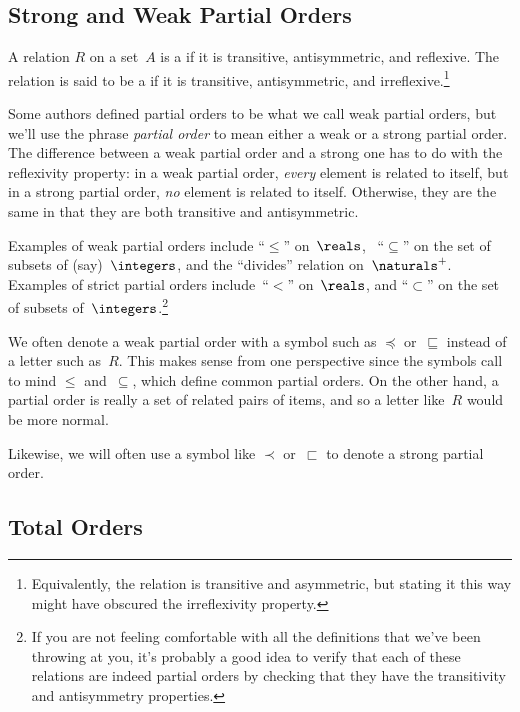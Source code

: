 \subsection{Strong and Weak Partial Orders}

\begin{definition}\label{def:weak_po}

A relation $R$ on a set~$A$ is a  if it is
transitive, antisymmetric, and reflexive.  The relation is said to be
a  if it is transitive, antisymmetric, and
irreflexive.\footnote{Equivalently, the relation is transitive and
  asymmetric, but stating it this way might have obscured the
  irreflexivity property.}

\end{definition}

Some authors defined partial orders to be what we call weak partial
orders, but we'll use the phrase \emph{partial order} to mean either a
weak or a strong partial order.  The difference between a weak partial
order and a strong one has to do with the reflexivity property: in a
weak partial order, \emph{every} element is related to itself, but in
a strong partial order, \emph{no} element is related to itself.
Otherwise, they are the same in that they are both transitive and
antisymmetric.

Examples of weak partial orders include ``$\le$'' on~$\reals$,
\ ``$\subseteq$'' on the set of subsets of (say)~$\integers$, and the
``divides'' relation on~$\naturals^+$.  Examples of strict partial
orders include~``$<$'' on~$\reals$, and ``$\subset$'' on the set of
subsets of~$\integers$.\footnote{If you are not feeling comfortable
  with all the definitions that we've been throwing at you, it's
  probably a good idea to verify that each of these relations are
  indeed partial orders by checking that they have the transitivity
  and antisymmetry properties.}

We often denote a weak partial order with a symbol such as $\preceq$
or~$\sqsubseteq$ instead of a letter such as~$R$.    This makes sense
from one perspective since the symbols call to mind $\le$
and~$\subseteq$, which define common partial orders.  On the other
hand, a partial order is really a set of related pairs of items, and
so a letter like~$R$ would be more normal.

Likewise, we will often use a symbol like $\prec$ or~$\sqsubset$ to
denote a strong partial order.

\subsection{Total Orders}

